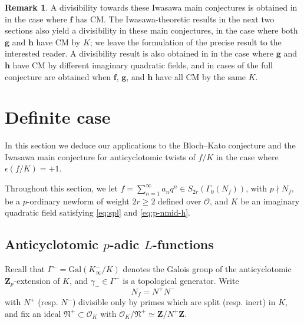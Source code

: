 \documentclass[10pt,letterpaper]{amsart}
\theoremstyle{plain}
\theoremstyle{definition}
\newtheorem{rmk}[thm]{Remark}
\theoremstyle{definition}
\theoremstyle{plain}
\theoremstyle{plain}
\theoremstyle{plain}
\theoremstyle{remark}
\numberwithin{equation}{section}
\newcommand{\cc}{\mathbf{c}}
\newcommand{\pp}{\mathfrak{p}}
\newcommand{\bZ}{\mathbf{Z}}
\def\cO{\mathcal O}
\newcommand{\Q}{\mathbf{Q}}
\def\iso{\simeq}
\newcommand{\bff}{{\boldsymbol{f}}}
\newcommand{\bfg}{{\boldsymbol{g}}}
\newcommand{\bfh}{{\boldsymbol{h}}}
\begin{document}
\begin{rmk}
A divisibility towards these Iwasawa main conjectures is obtained in \cite{ACR} in the case where $\bff$ has CM. The Iwasawa-theoretic results in the next two sections also yield a divisibility in these main conjectures, in the case where both $\bfg$ and $\bfh$ have CM by $K$; we leave the formulation of the precise result to the interested reader. A divisibility result is also obtained in \cite{Do-biquadratic} in the case where $\bfg$ and $\bfh$ have CM by different imaginary quadratic fields, and in \cite{GKC-cm} cases of the full conjecture are obtained when $\bff$, $\bfg$, and $\bfh$ have all CM by the same $K$.
\end{rmk}




\section{Definite case}\label{sec:definite}

In this section we deduce our applications to the Bloch--Kato conjecture and the Iwasawa main conjecture for anticyclotomic twists of $f/K$ in the case where $\epsilon(f/K)=+1$.

Throughout this section, we let $f=\sum_{n=1}^\infty a_nq^n\in S_{2r}(\Gamma_0(N_f))$, with $p\nmid N_f$, be a $p$-ordinary newform of weight $2r\geq 2$ defined over $\cO$, and $K$ be an imaginary quadratic field satisfying \eqref{eq:spl} and \eqref{eq:p-nmid-h}. 


\subsection{Anticyclotomic \texorpdfstring{$p$}{p}-adic \texorpdfstring{$L$}{L}-functions}\label{subsec:Lp-def}


Recall that $\Gamma^-={\mathrm{Gal}}(K_\infty^-/K)$ denotes the Galois group of the anticyclotomic $\bZ_p$-extension of $K$, and $\gamma_-\in\Gamma^-$ is a topological generator. Write 
\[
N_f=N^+ N^-
\] 
with $N^+$ (resp. $N^-$) divisible only by primes which are split (resp. inert) in $K$, and fix an ideal $\mathfrak{N}^+\subset\cO_K$ with $\cO_K/\mathfrak{N}^+\iso\bZ/N^+\bZ$. 

\end{document}

